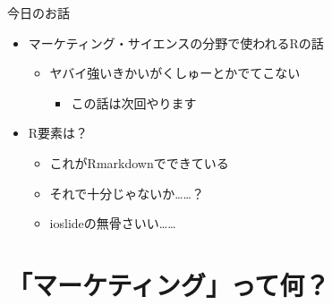 \documentclass[ignorenonframetext,]{beamer}
\providecommand{\tightlist}{%
  \setlength{\itemsep}{0pt}\setlength{\parskip}{0pt}}
\begin{document}
\begin{frame}{今日のお話}
\protect\hypertarget{-1}{}

\begin{itemize}
\tightlist
\item
  マーケティング・サイエンスの分野で使われるRの話

  \begin{itemize}
  \tightlist
  \item
    ヤバイ強いきかいがくしゅーとかでてこない

    \begin{itemize}
    \tightlist
    \item
      この話は次回やります
    \end{itemize}
  \end{itemize}
\item
  R要素は？

  \begin{itemize}
  \tightlist
  \item
    これがRmarkdownでできている
  \item
    それで十分じゃないか\ldots{}\ldots{}？
  \item
    ioslideの無骨さいい\ldots{}\ldots{}
  \end{itemize}
\end{itemize}

\end{frame}

\section{「マーケティング」って何？}
\end{document}
